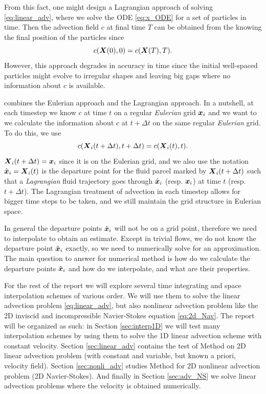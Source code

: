 \documentclass[11pt,letterpaper]{article}
\begin{document}
From this fact, one might design a Lagrangian approach of solving \eqref{eq:linear_adv}, where we solve the ODE \eqref{eq:x_ODE} for a set of particles in time. Then the advection field $c$ at final time $T$ can be obtained from the knowing the final position of the particles since 
$$c(\boldsymbol{X}(0),0) = c(\boldsymbol{X}(T),T).$$
However, this approach degrades in accuracy in time since the initial well-spaced particles might evolve to irregular shapes and leaving big gaps where no information about $c$ is available. 

\sml\;combines the Eulerian approach and the Lagrangian approach. In a nutshell, at each timestep we know $c$ at time $t$ on a regular \textit{Eulerian} grid $\boldsymbol{x}_i$ and we want to we calculate the information about $c$ at $t+\Delta t$ on the same regular \textit{Eulerian} grid. To do this, we use
$$c(\boldsymbol{X}_i(t+\Delta t),t+\Delta t) = c({\boldsymbol{X}}_i(t),t).$$
$\boldsymbol{X}_i(t+\Delta t) = \boldsymbol{x}_i$ since it is on the Eulerian grid, and we also use the notation $\hat{\boldsymbol{x}}_i = {\boldsymbol{X}}_i(t)$ is the departure point for the fluid parcel marked by $\boldsymbol{X}_i(t+\Delta t)$ such that a \textit{Lagrangian} fluid trajectory goes through $\hat{\boldsymbol{x}}_i$ (resp. ${\boldsymbol{x}}_i$) at time $t$ (resp. $t+\Delta t$).
The Lagrangian treatment of advection in each timestep allows for bigger time steps to be taken, and we still maintain the grid structure in Eulerian space. 

In general the departure points $\hat{\boldsymbol{x}}_i$ will not be on a grid point, therefore we need to interpolate to obtain an estimate. Except in trivial flows, we do not know the departure point $\hat{\boldsymbol{x}}_i$ exactly, so we need to numerically solve for an approximation. The main question to answer for \sml\;numerical method is how do we calculate the departure points $\hat{\boldsymbol{x}}_i$ and how do we interpolate, and what are their properties. 

For the rest of the report we will explore several time integrating and space interpolation schemes of various order. We will use them to solve the linear advection problem \eqref{eq:linear_adv}, but also nonlinear advection problem like the 2D inviscid and incompressible Navier-Stokes equation \eqref{eq:2d_Nav}. The report will be organized as such: in Section \ref{sec:interp1D} we will test many interpolation schemes by using them to solve the 1D linear advection scheme with constant velocity. Section \ref{sec:linear_adv} contains the test of \sml\;Method on 2D linear advection problem (with constant and variable, but known a priori, velocity field). Section \ref{sec:nonli_adv} studies \sml\;Method for 2D nonlinear advection problem (2D Navier-Stokes). And finally in Section \ref{sec:adv_NS} we solve linear advection problems where the velocity is obtained numerically. 
\end{document}
